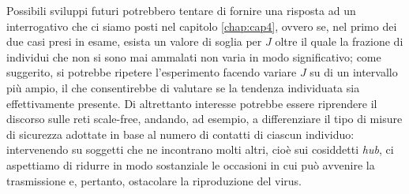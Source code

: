 Possibili sviluppi futuri potrebbero tentare di fornire una risposta ad un interrogativo che ci siamo posti nel capitolo \ref{chap:cap4}, ovvero se, nel primo dei due casi presi in esame, esista un valore di soglia per $ J $ oltre il quale la frazione di individui che non si sono mai ammalati non varia in modo significativo; come suggerito, si potrebbe ripetere l'esperimento facendo variare $ J $ su di un intervallo più ampio, il che consentirebbe di valutare se la tendenza individuata sia effettivamente presente. Di altrettanto interesse potrebbe essere riprendere il discorso sulle reti scale-free, andando, ad esempio, a differenziare il tipo di misure di sicurezza adottate in base al numero di contatti di ciascun individuo: intervenendo su soggetti che ne incontrano molti altri, cioè sui cosiddetti \emph{hub}, ci aspettiamo di ridurre in modo sostanziale le occasioni in cui può avvenire la trasmissione e, pertanto, ostacolare la riproduzione del virus.
	
	
	